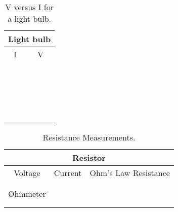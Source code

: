 \begin{table}[htb]
\begin{center}
\begin{tabular}{|c|c|}
\hline
\multicolumn{2}{|c|}{Light bulb}\\
\hline
I & V \\
\hline
\hspace*{5cm} & \hspace*{5cm} \\
& \\
\hline
& \\
& \\
\hline
& \\
& \\
\hline
& \\
& \\
\hline
& \\
& \\
\hline
& \\
& \\
\hline
& \\
& \\
\hline
& \\
& \\
\hline
& \\
& \\
\hline
& \\
& \\
\hline
\end{tabular}
\end{center}
\caption{V versus I for a light bulb.}
\label{tab:DC:ltbulbplot}
\end{table}

\begin{table}[htb]
\begin{center}
\begin{tabular}{|c|c|c|}
\hline
\multicolumn{3}{|c|}{Resistor} \\
\hline 
Voltage & Current & Ohm's Law Resistance \\ 
\hline
\hspace*{3cm} & \hspace*{3cm} & \hspace*{3cm} \\ 
& &  \\ 
\hline
Ohmmeter &  &  \\ 
\hline
& &  \\
& &  \\
\hline
\end{tabular}
\end{center}
\caption{Resistance Measurements.}
\label{tab:DC:newres}
\end{table}

